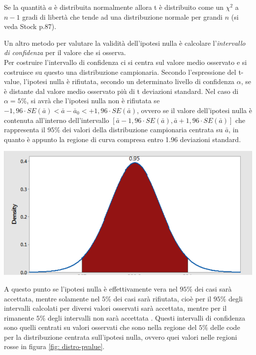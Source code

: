 Se la quantità $a$ è distribuita normalmente allora t è distribuito come un $\chi^2$ a $n-1$ gradi di libertà che tende ad una distribuzione normale per grandi $n$ (si veda Stock p.87).

\begin{tcolorbox}[colback=cyan!5!white, colframe=cyan!75!black, title= \textbf{Intervallo di confidenza}, sidebyside align=center, lower separated=false]
	Un altro metodo per valutare la validità dell'ipotesi nulla è calcolare l'\textit{intervallo di confidenza} per il valore che si osserva.\\
	Per costruire l'intervallo di confidenza ci si centra sul valore medio osservato e si costruisce su questo una distribuzione campionaria. Secondo l'espressione del t-value, l'ipotesi nulla è rifiutata, secondo un determinato livello di confidenza $\alpha$, se è distante dal valore medio osservato più di t deviazioni standard. Nel caso di $\alpha = 5\%$, si avrà che l'ipotesi nulla non è rifiutata se $-1,96 \cdot SE(\bar{a}) < \bar{a} - \bar{a}_0 < +1,96 \cdot SE(\bar{a})$, ovvero se il valore dell'ipotesi nulla è contenuta all'interno dell'intervallo $[\bar{a} - 1,96 \cdot SE(\bar{a}), \bar{a} + 1,96 \cdot SE(\bar{a})]$ che rappresenta il $95\%$ dei valori della distribuzione campionaria centrata su $\bar{a}$, in quanto è appunto la regione di curva compresa entro 1.96 deviazioni standard.
	\begin{center}
		\includegraphics[scale=0.3]{Immagini/intervallo-di-confidenza.png}
	\end{center}
	A questo punto se l'ipotesi nulla è effettivamente vera nel $95\%$ dei casi sarà accettata, mentre solamente nel $5\%$ dei casi sarà rifiutata, cioè per il $95\%$ degli intervalli calcolati per diversi valori osservati sarà accettata, mentre per il rimanente $5\%$ degli intervalli non sarà accettata . Questi intervalli di confidenza sono quelli centrati su valori osservati che sono nella regione del $5\%$ delle code per la distribuzione centrata sull'ipotesi nulla, ovvero quei valori nelle regioni rosse in figura \ref{fig: distro-pvalue}. 
\end{tcolorbox}


